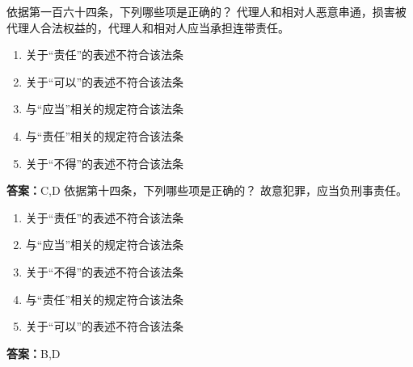 \documentclass[12pt]{ctexart}
\begin{document}
\begin{questions}
\question 依据第一百六十四条，下列哪些项是正确的？
代理人和相对人恶意串通，损害被代理人合法权益的，代理人和相对人应当承担连带责任。
\begin{enumerate}[label=\Alph*.]
\item 关于“责任”的表述不符合该法条
\item 关于“可以”的表述不符合该法条
\item 与“应当”相关的规定符合该法条
\item 与“责任”相关的规定符合该法条
\item 关于“不得”的表述不符合该法条
\end{enumerate}
\ifprintanswers\par\textbf{答案：}C,D\fi
\question 依据第十四条，下列哪些项是正确的？
故意犯罪，应当负刑事责任。
\begin{enumerate}[label=\Alph*.]
\item 关于“责任”的表述不符合该法条
\item 与“应当”相关的规定符合该法条
\item 关于“不得”的表述不符合该法条
\item 与“责任”相关的规定符合该法条
\item 关于“可以”的表述不符合该法条
\end{enumerate}
\ifprintanswers\par\textbf{答案：}B,D\fi
\end{questions}
\end{document}
